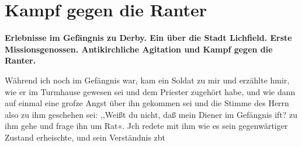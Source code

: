 \chapter[Kampf gegen die Ranter]{Kampf gegen die Ranter}

\begin{center}
\textbf{Erlebnisse im Gefängnis zu Derby. Ein  
über die Stadt
Lichfield. Erste Missionsgenossen. Antikirchliche 
Agitation und Kampf gegen die Ranter.}
\end{center}


Während ich noch im Gefängnis war, kam ein Soldat zu
mir und erzählte hmir, wie er im Turmhause gewesen sei und dem
Priester zugehört habe, und wie dann auf einmal eine grofze Angst
über ihn gekommen sei und die Stimme des Herrn also zu ihm
geschehen sei: ,,Weißt du nicht, daß mein Diener im Gefängnis
ift? zu ihm gehe und frage ihn um Rat«. Jch redete mit ihm
wie es sein gegenwärtiger Zustand erheischte, und sein Verständnis
zbt


